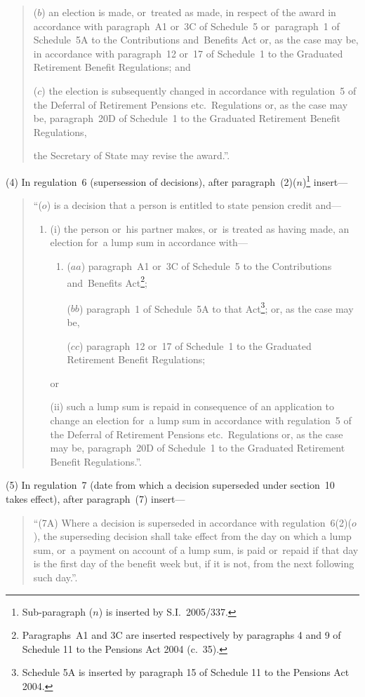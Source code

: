 \documentclass[12pt,a4paper]{article}
\begin{document}
\begin{quotation}
\begin{enumerate}
($b$) an election is made, or~treated as made, in respect of the award in accordance with paragraph~A1 or~3C of Schedule~5 or~paragraph~1 of Schedule~5A to the Contributions and~Benefits Act or, as the case may be, in accordance with paragraph~12 or~17 of Schedule~1 to the Graduated Retirement Benefit Regulations; and

($c$) the election is subsequently changed in accordance with regulation~5 of the Deferral of Retirement Pensions etc.\ Regulations or, as the case may be, paragraph~20D of Schedule~1 to the Graduated Retirement Benefit Regulations,
\end{enumerate}
the Secretary of State may revise the award.”.
\end{quotation}

(4) In regulation~6 (supersession of decisions), after paragraph~(2)($n$)\footnote{Sub-paragraph ($n$)  is inserted by S.I.~2005/337.} insert—
\begin{quotation}
“($o$) is a decision that a person is entitled to state pension credit and—
\begin{enumerate}\item[]
(i) the person or~his partner makes, or~is treated as having made, an election for~a lump sum in accordance with—
\begin{enumerate}\item[]
($aa$) paragraph~A1 or~3C of Schedule~5 to the Contributions and~Benefits Act\footnote{Paragraphs~A1 and 3C are inserted respectively by paragraphs 4 and 9 of Schedule 11 to the Pensions Act 2004 (c.~35).};

($bb$) paragraph~1 of Schedule~5A to that Act\footnote{Schedule 5A is inserted by paragraph 15 of Schedule 11 to the Pensions Act 2004.}; or, as the case may be,

($cc$) paragraph~12 or~17 of Schedule~1 to the Graduated Retirement Benefit Regulations;
\end{enumerate}
or

(ii) such a lump sum is repaid in consequence of an application to change an election for~a lump sum in accordance with regulation~5 of the Deferral of Retirement Pensions etc.\ Regulations or, as the case may be, paragraph~20D of Schedule~1 to the Graduated Retirement Benefit Regulations.”.
\end{enumerate}
\end{quotation}

(5) In regulation~7 (date from which a decision superseded under section~10 takes effect), after paragraph~(7) insert—
\begin{quotation}
“(7A) Where a decision is superseded in accordance with regulation~6(2)($o$), the superseding decision shall take effect from the day on which a lump sum, or~a payment on account of a lump sum, is paid or~repaid if that day is the first day of the benefit week but, if it is not, from the next following such day.”.
\end{quotation}
\end{document}
